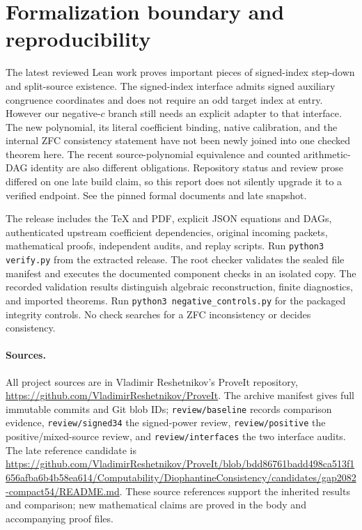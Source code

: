 \documentclass[11pt]{article}
\begin{document}
\section{Formalization boundary and reproducibility}
The latest reviewed Lean work proves important pieces of signed-index
step-down and split-source existence. The signed-index interface admits
signed auxiliary congruence coordinates and does not require an odd target
index at entry. However our negative-$c$ branch still needs an explicit
adapter to that interface. The new polynomial, its literal coefficient
binding, native calibration, and the internal ZFC consistency statement
have not been newly joined into one checked theorem here.
The recent source-polynomial equivalence and counted arithmetic-DAG identity
are also different obligations. Repository status and review prose differed
on one late build claim, so this report does not silently upgrade it to a
verified endpoint. See the pinned formal documents and late snapshot.

The release includes the TeX and PDF, explicit JSON equations and DAGs,
authenticated upstream coefficient dependencies, original incoming packets,
mathematical proofs, independent audits, and replay scripts.
Run \texttt{python3 verify.py} from the extracted release. The root checker
validates the sealed file manifest and executes the documented component
checks in an isolated copy. The recorded validation results distinguish
algebraic reconstruction, finite diagnostics, and imported theorems.
Run \texttt{python3 negative\_controls.py} for the packaged integrity controls.
No check searches for a ZFC inconsistency or decides consistency.

\paragraph{Sources.}
All project sources are in Vladimir Reshetnikov's ProveIt repository,
\url{https://github.com/VladimirReshetnikov/ProveIt}.
The archive manifest gives full immutable commits and Git blob IDs;
\texttt{review/baseline} records comparison evidence,
\texttt{review/signed34} the signed-power review,
\texttt{review/positive} the positive/mixed-source review, and
\texttt{review/interfaces} the two interface audits.
The late reference candidate is
\url{https://github.com/VladimirReshetnikov/ProveIt/blob/bdd86761badd498ca513f1656afba6b4b58ea614/Computability/DiophantineConsistency/candidates/gap2082-compact54/README.md}.
These source references support the inherited results and comparison;
new mathematical claims are proved in the body and accompanying proof files.
\end{document}
